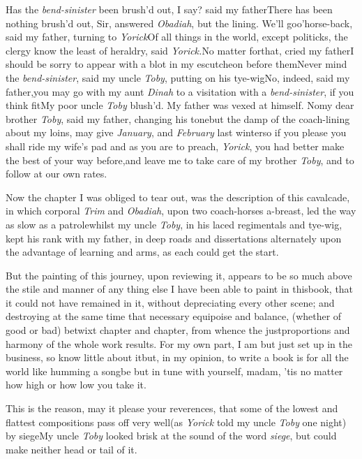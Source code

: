\documentclass{article}
\begin{document}
\tsk Has the \textit{bend-sinister} been brush’d out, I
say? said my father\tsk There has been nothing brush’d out, Sir, answered
\textit{Obadiah}, but the lining. We’ll go\break o’horse-back,
said my father, turning to \textit{Yorick}\tsk Of all things in the
world, except politicks, the clergy know the least of heraldry,
said \textit{Yorick.}\tsk No matter for\pb that, cried my
father\tsk I should be sorry to appear with a blot in my
escutcheon before them\tsh Never mind the
\textit{bend-sinister}, said my uncle \textit{Toby}, putting
on his tye-wig\tsh No, indeed, said my father,\break \tsk you
may go with my aunt \textit{Dinah} to a visitation with a
\textit{bend-sinister}, if you think fit\tsk My poor uncle
\textit{Toby} blush’d. My father was vexed at himself.\tsk
No\tsk my dear brother \textit{Toby}, said my father,
changing his tone\tsk but the damp of the coach-lining about
my loins, may give  \textit{January}, and \textit{February} last
winter\tsk so if you please you shall ride my wife’s
pad\break\tsk
and as you are to preach, \textit{Yorick}, you had better
make the best of your way before,\tsk and leave me to take
care of my brother \textit{Toby}, and to follow at our\break
own rates.

\newpage
Now the chapter I was obliged to tear out, was the description
of this cavalcade, in which corporal \textit{Trim} and
\textit{Obadiah}, upon two coach-horses a-breast, led the way as slow
as a patrole\tsh whilst my uncle \textit{Toby}, in his laced
regimentals and tye-wig, kept his rank with my father, in deep
roads and dissertations alternately upon the advantage of learning
and arms, as each could get the start.


\tsk But the painting of this journey, upon reviewing it,
appears to be so much above the stile and manner of any thing else
I have been able to paint in this\break book, that it could not have
remained in it, without depreciating every other scene; and
destroying at the same time that necessary equipoise and
balance,\break
(whether of good or bad) betwixt chapter and chapter, from whence
the just\pb  proportions and harmony of the whole work results. For my
own part, I am but just set up in the business, so know little
about it\tsk but, in my opinion, to write a book is for all the
world like humming a song\tsk be but in tune with yourself,
madam, ’tis no matter how high or how low you take it.\tsk


\tsk This is the reason, may it please your reverences, that
some of the lowest and flattest compositions pass off
very\break
well\tsk (as \textit{Yorick} told my uncle \textit{Toby} one
night) by siege\tsk My uncle \textit{Toby} looked brisk at
the sound of the word \textit{siege}, but could make neither head or tail of
it.
\end{document}
